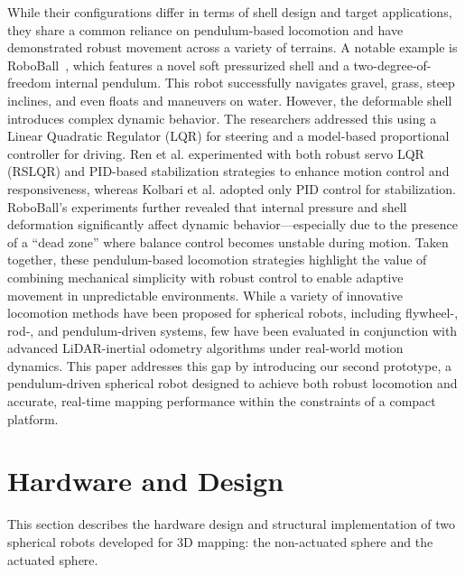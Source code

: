 \documentclass[a4paper, conference]{IEEEtran}
\begin{document}
While their configurations differ in terms of shell design and target applications, they share a common reliance on pendulum-based locomotion and have demonstrated robust movement across a variety of terrains.
A notable example is RoboBall~\cite{roboball}, which features a novel soft pressurized shell and a two-degree-of-freedom internal pendulum. 
This robot successfully navigates gravel, grass, steep inclines, and even floats and maneuvers on water. 
However, the deformable shell introduces complex dynamic behavior. 
The researchers addressed this using a Linear Quadratic Regulator (LQR) for steering and a model-based proportional controller for driving. 
Ren et al. \cite{novelsphere} experimented with both robust servo LQR (RSLQR) and PID-based stabilization strategies to enhance motion control and responsiveness, whereas Kolbari et al. \cite{pendulum_sphere} adopted only PID control for stabilization. 
RoboBall’s experiments further revealed that internal pressure and shell deformation significantly affect dynamic behavior—especially due to the presence of a ``dead zone'' where balance control becomes unstable during motion.
Taken together, these pendulum-based locomotion strategies highlight the value of combining mechanical simplicity with robust control to enable adaptive movement in unpredictable environments. 
While a variety of innovative locomotion methods have been proposed for spherical robots, including flywheel-, rod-, and pendulum-driven systems, few have been evaluated in conjunction with advanced LiDAR-inertial odometry algorithms under real-world motion dynamics.
This paper addresses this gap by introducing our second prototype, a pendulum-driven spherical robot designed to achieve both robust locomotion and accurate, real-time mapping performance within the constraints of a compact platform.

\section{Hardware and Design}\label{sec:hardwaredesing}
This section describes the hardware design and structural implementation of two spherical robots developed for 3D mapping: the non-actuated sphere and the actuated sphere.
\end{document}
